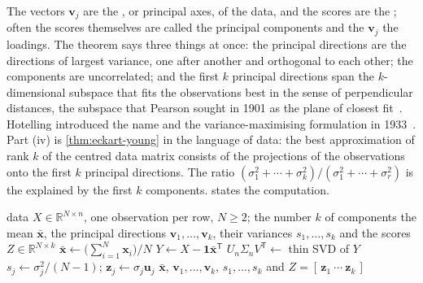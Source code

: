 The vectors $\mathbf v_j$ are the , or principal axes, of the data, and the scores are the ; often the scores themselves are called the principal components and the $\mathbf v_j$ the loadings. The theorem says three things at once: the principal directions are the directions of largest variance, one after another and orthogonal to each other; the components are uncorrelated; and the first $k$ principal directions span the $k$-dimensional subspace that fits the observations best in the sense of perpendicular distances, the subspace that Pearson sought in 1901 as the plane of closest fit~\cite{pearson1901}. Hotelling introduced the name and the variance-maximising formulation in 1933~\cite{hotelling1933}. Part (iv) is \cref{thm:eckart-young} in the language of data: the best approximation of rank $k$ of the centred data matrix consists of the projections of the observations onto the first $k$ principal directions. The ratio $(\sigma_1^2+\cdots+\sigma_k^2)/(\sigma_1^2+\cdots+\sigma_r^2)$ is the  explained by the first $k$ components.  states the computation.

\begin{algorithm}
\begin{algorithmic}[1]
\Require data $X\in\mathbb R^{N\times n}$, one observation per row, $N\ge2$; the number $k$ of components
\Ensure the mean $\bar{\mathbf x}$, the principal directions $\mathbf v_1,\ldots,\mathbf v_k$, their variances $s_1,\ldots,s_k$ and the scores $Z\in\mathbb R^{N\times k}$
\State $\bar{\mathbf x}\gets\bigl(\sum_{i=1}^N\mathbf x_i\bigr)/N$ 
\State $Y\gets X-\mathbf 1\bar{\mathbf x}^{\mathsf T}$ 
\State $U_n\Sigma_nV^{\mathsf T}\gets$ thin SVD of $Y$ 
  \State $s_j\gets\sigma_j^2/(N-1)$; $\mathbf z_j\gets\sigma_j\mathbf u_j$ 
\EndFor
\State \Return $\bar{\mathbf x}$, $\mathbf v_1,\ldots,\mathbf v_k$, $s_1,\ldots,s_k$ and $Z=[\,\mathbf z_1\ \cdots\ \mathbf z_k\,]$
\end{algorithmic}
\caption{Principal component analysis by the singular value decomposition (\cref{thm:pca}). The approximation of the data by $k$ components is $\mathbf 1\bar{\mathbf x}^{\mathsf T}+ZV_k^{\mathsf T}$. The cost is dominated by the thin SVD, of the order of $Nn^2$ operations for $N\ge n$ (Volume~VIII).}
\label{alg:pca}
\end{algorithm}

